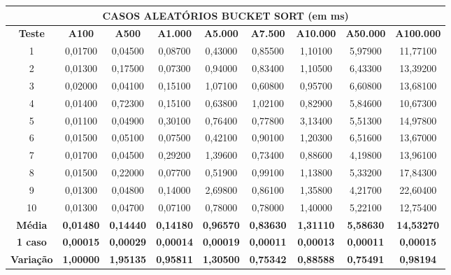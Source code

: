 \documentclass[a4paper, 12pt]{article}
\begin{document}
\begin{tabular}{ccccccccc}

                                                   \multicolumn{ 9}{c}{{\bf CASOS ALEATÓRIOS BUCKET SORT (em ms)}} \\
\hline
{\bf Teste} & {\bf A100} & {\bf A500} & {\bf A1.000} & {\bf A5.000} & {\bf A7.500} & {\bf A10.000} & {\bf A50.000} & {\bf A100.000} \\
\hline
         1 &    0,01700 &    0,04500 &    0,08700 &    0,43000 &    0,85500 &    1,10100 &    5,97900 &   11,77100 \\
\hline
         2 &    0,01300 &    0,17500 &    0,07300 &    0,94000 &    0,83400 &    1,10500 &    6,43300 &   13,39200 \\
\hline
         3 &    0,02000 &    0,04100 &    0,15100 &    1,07100 &    0,60800 &    0,95700 &    6,60800 &   13,68100 \\
\hline
         4 &    0,01400 &    0,72300 &    0,15100 &    0,63800 &    1,02100 &    0,82900 &    5,84600 &   10,67300 \\
\hline
         5 &    0,01100 &    0,04900 &    0,30100 &    0,76400 &    0,77800 &    3,13400 &    5,51300 &   14,97800 \\
\hline
         6 &    0,01500 &    0,05100 &    0,07500 &    0,42100 &    0,90100 &    1,20300 &    6,51600 &   13,67000 \\
\hline
         7 &    0,01700 &    0,04500 &    0,29200 &    1,39600 &    0,73400 &    0,88600 &    4,19800 &   13,96100 \\
\hline
         8 &    0,01500 &    0,22000 &    0,07700 &    0,51900 &    0,99100 &    1,13800 &    5,33200 &   17,84300 \\
\hline
         9 &    0,01300 &    0,04800 &    0,14000 &    2,69800 &    0,86100 &    1,35800 &    4,21700 &   22,60400 \\
\hline
        10 &    0,01300 &    0,04700 &    0,07100 &    0,78000 &    0,78000 &    1,40000 &    5,22100 &   12,75400 \\
\hline
{\bf Média} & {\bf 0,01480} & {\bf 0,14440} & {\bf 0,14180} & {\bf 0,96570} & {\bf 0,83630} & {\bf 1,31110} & {\bf 5,58630} & {\bf 14,53270} \\
\hline
{\bf 1 caso} & {\bf 0,00015} & {\bf 0,00029} & {\bf 0,00014} & {\bf 0,00019} & {\bf 0,00011} & {\bf 0,00013} & {\bf 0,00011} & {\bf 0,00015} \\
\hline
{\bf Variação} & {\bf 1,00000} & {\bf 1,95135} & {\bf 0,95811} & {\bf 1,30500} & {\bf 0,75342} & {\bf 0,88588} & {\bf 0,75491} & {\bf 0,98194} \\
\hline
\end{tabular}  
\vspace{0.3cm}
\end{document}
